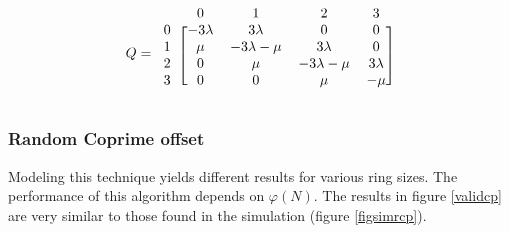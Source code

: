 \documentclass[10pt,a4paper]{article}
\begin{document}
\[ Q =
  \begin{blockarray}{ccccc}
    & 0 & 1 & 2 & 3 \\
    \begin{block}{c[cccc]}
    0 & -3\lambda & 3\lambda & 0 & 0 \\
    1 & \mu & -3\lambda-\mu & 3\lambda & 0 \\
    2 & 0 & \mu & -3\lambda-\mu & 3\lambda \\
    3 & 0 & 0 & \mu & -\mu \\
    \end{block}
  \end{blockarray}
\]

\subsubsection*{Random Coprime offset}
Modeling this technique yields different results for various ring sizes. The performance of this algorithm depends on $\varphi(N)$. The results in figure \ref{validcp} are very similar to those found in the simulation (figure \ref{figsimrcp}).
\end{document}
